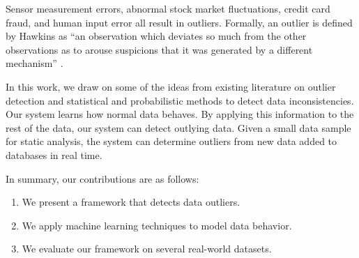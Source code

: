 
Sensor measurement errors, abnormal stock market fluctuations, credit card fraud, and human input error all result in outliers.
Formally, an outlier is defined by Hawkins as “an observation which deviates so much from the other observations as to arouse suspicions that it was generated by a different mechanism” \cite{Hawkins1980}.


In this work, we draw on some of the ideas from existing literature on outlier detection and statistical and probabilistic methods to detect data inconsistencies.
Our system learns how normal data behaves.
By applying this information to the rest of the data, our system can detect outlying data.
Given a small data sample for static analysis, the system can determine outliers from new data added to databases in real time.

In summary, our contributions are as follows:
\begin{enumerate}
\item We present a framework that detects data outliers.
\item We apply machine learning techniques to model data behavior.
\item We evaluate our framework on several real-world datasets.
\end{enumerate}


